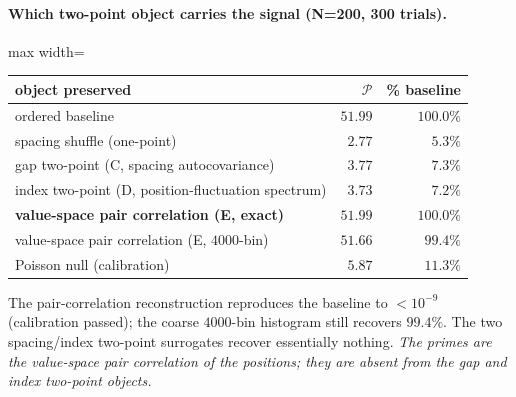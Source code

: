 \documentclass[11pt]{article}
\begin{document}
\paragraph{Which two-point object carries the signal (N=200, 300 trials).}
\begin{center}
\begin{adjustbox}{max width=\linewidth}\begin{tabular}{lrr}
\toprule
object preserved & $\mathcal P$ & \% baseline \\
\midrule
ordered baseline & $51.99$ & $100.0\%$ \\
spacing shuffle (one-point) & $2.77$ & $5.3\%$ \\
gap two-point (C, spacing autocovariance) & $3.77$ & $7.3\%$ \\
index two-point (D, position-fluctuation spectrum) & $3.73$ & $7.2\%$ \\
\textbf{value-space pair correlation (E, exact)} & $\mathbf{51.99}$ & $\mathbf{100.0\%}$ \\
value-space pair correlation (E, $4000$-bin) & $51.66$ & $99.4\%$ \\
\midrule
Poisson null (calibration) & $5.87$ & $11.3\%$ \\
\bottomrule
\end{tabular}\end{adjustbox}
\end{center}
\noindent The pair-correlation reconstruction reproduces the baseline to $<\!10^{-9}$ (calibration passed); the coarse $4000$-bin histogram still recovers $99.4\%$. The two spacing/index two-point surrogates recover essentially nothing. \emph{The primes are the value-space pair correlation of the positions; they are absent from the gap and index two-point objects.}
\end{document}
